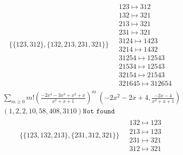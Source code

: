 \begin{scriptsize}
\begin{align}
\begin{matrix}
\end{matrix}
\\
\{\{123, 312\}, \{132, 213, 231, 321\}\}
\ 
&
\begin{matrix}
123 \mapsto 312\\132 \mapsto 321\\213 \mapsto 321\\231 \mapsto 321\\3124 \mapsto 1423\\3214 \mapsto 1432\\31254 \mapsto 12543\\21534 \mapsto 12543\\32154 \mapsto 21543\\321645 \mapsto 312654
\end{matrix}
\end{align}
$$
\begin{matrix}
\sum_{m \geq 0} m! \left(
\frac{-2 x^{4} - 3 x^{3} + x^{2} + x}{x^{2} + x + 1}
\right)^m
\ 
\left(-2 x^{2} - 2 x + 4, \frac{-2 x - 4}{x^{2} + x + 1}\right)
\\
\left(1, 2, 2, 10, 58, 408, 3110\right)
\texttt{Not found}
\end{matrix}
$$
\begin{align}
\{\{123, 132, 213\}, \{231, 312, 321\}\}
\ 
&
\begin{matrix}
132 \mapsto 123\\213 \mapsto 123\\231 \mapsto 321\\312 \mapsto 321
\end{matrix}
\end{align}
\end{scriptsize}
